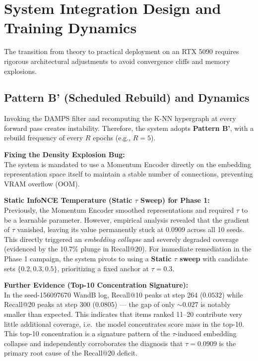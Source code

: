 \documentclass[12pt, a4paper]{article}
\begin{document}
\section{System Integration Design and Training Dynamics}
The transition from theory to practical deployment on an RTX 5090 requires rigorous architectural adjustments to avoid convergence cliffs and memory explosions.

\subsection{Pattern B' (Scheduled Rebuild) and Dynamics}
Invoking the DAMPS filter and recomputing the K-NN hypergraph at every forward pass creates instability. Therefore, the system adopts \textbf{Pattern B'}, with a rebuild frequency of every $R$ epochs (e.g., $R=5$).

\noindent \textbf{Fixing the Density Explosion Bug:}\\
The system is mandated to use a Momentum Encoder directly on the embedding representation space itself to maintain a stable number of connections, preventing VRAM overflow (OOM).

\noindent \textbf{Static InfoNCE Temperature (Static $\tau$ Sweep) for Phase 1:}\\
Previously, the Momentum Encoder smoothed representations and required $\tau$ to be a learnable parameter. However, empirical analysis revealed that the gradient of $\tau$ vanished, leaving its value permanently stuck at 0.0909 across all 10 seeds. This directly triggered an \textit{embedding collapse} and severely degraded coverage (evidenced by the 10.7\% plunge in Recall@20). For immediate remediation in the Phase 1 campaign, the system pivots to using a \textbf{Static $\tau$ sweep} with candidate sets $\{0.2, 0.3, 0.5\}$, prioritizing a fixed anchor at $\tau = 0.3$.

\noindent \textbf{Further Evidence (Top-10 Concentration Signature):}\\
In the seed-156097670 WandB log, Recall@10 peaks at step 264 ($0.0532$) while Recall@20 peaks at step 300 ($0.0805$) --- the gap of only $\sim 0.027$ is notably smaller than expected. This indicates that items ranked 11--20 contribute very little additional coverage, i.e.\ the model concentrates score mass in the top-10. This top-10 concentration is a signature pattern of the $\tau$-induced embedding collapse and independently corroborates the diagnosis that $\tau = 0.0909$ is the primary root cause of the Recall@20 deficit.
\end{document}
